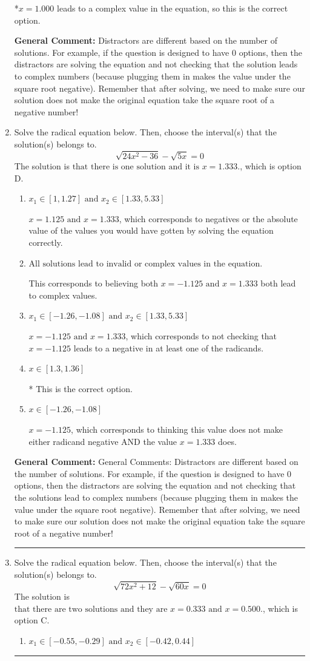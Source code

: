 \documentclass{extbook}[14pt]
\newcommand{\litem}[1]{\item #1

\rule{\textwidth}{0.4pt}}
\begin{document}
\begin{enumerate}
{\begin{enumerate}[label=\Alph*.]
*$x = 1.000$ leads to a complex value in the equation, so this is the correct option.
\end{enumerate}

\textbf{General Comment:} Distractors are different based on the number of solutions. For example, if the question is designed to have 0 options, then the distractors are solving the equation and not checking that the solution leads to complex numbers (because plugging them in makes the value under the square root negative). Remember that after solving, we need to make sure our solution does not make the original equation take the square root of a negative number!
}
\litem{
Solve the radical equation below. Then, choose the interval(s) that the solution(s) belongs to.
\[ \sqrt{24 x^2 - 36} - \sqrt{5 x} = 0 \]
The solution is \( \text{that there is one solution and it is } x = 1.333. \), which is option D.\begin{enumerate}[label=\Alph*.]
\item \( x_1 \in [1, 1.27] \text{ and } x_2 \in [1.33,5.33] \)

$x = 1.125 \text{ and } x = 1.333$, which corresponds to negatives or the absolute value of the values you would have gotten by solving the equation correctly.
\item \( \text{All solutions lead to invalid or complex values in the equation.} \)

This corresponds to believing both $x = -1.125 \text{ and } x = 1.333$ both lead to complex values.
\item \( x_1 \in [-1.26, -1.08] \text{ and } x_2 \in [1.33,5.33] \)

$x = -1.125 \text{ and } x = 1.333$, which corresponds to not checking that $x = -1.125$ leads to a negative in at least one of the radicands.
\item \( x \in [1.3,1.36] \)

* This is the correct option.
\item \( x \in [-1.26,-1.08] \)

$x = -1.125$, which corresponds to thinking this value does not make either radicand negative AND the value $x = 1.333$ does.
\end{enumerate}

\textbf{General Comment:} General Comments: Distractors are different based on the number of solutions. For example, if the question is designed to have 0 options, then the distractors are solving the equation and not checking that the solutions lead to complex numbers (because plugging them in makes the value under the square root negative). Remember that after solving, we need to make sure our solution does not make the original equation take the square root of a negative number!
}
\litem{
Solve the radical equation below. Then, choose the interval(s) that the solution(s) belongs to.
\[ \sqrt{72 x^2 + 12} - \sqrt{60 x} = 0 \]
The solution is \( \text{that there are two solutions and they are } x = 0.333 \text{ and } x = 0.500. \), which is option C.\begin{enumerate}[label=\Alph*.]
\item \( x_1 \in [-0.55, -0.29] \text{ and } x_2 \in [-0.42,0.44] \)


\end{enumerate}}
\end{enumerate}
\end{document}
